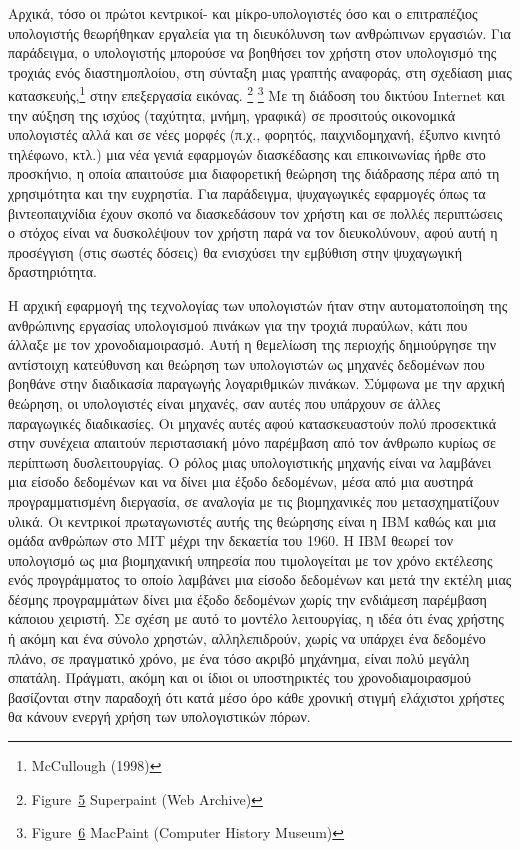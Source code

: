 \documentclass[
]{article}
\begin{document}
Αρχικά, τόσο οι πρώτοι κεντρικοί- και μίκρο-υπολογιστές όσο και ο
επιτραπέζιος υπολογιστής θεωρήθηκαν εργαλεία για τη διευκόλυνση των
ανθρώπινων εργασιών. Για παράδειγμα, ο υπολογιστής μπορούσε να βοηθήσει
τον χρήστη στον υπολογισμό της τροχιάς ενός διαστημοπλοίου, στη σύνταξη
μιας γραπτής αναφοράς, στη σχεδίαση μιας κατασκευής,\footnote{McCullough
  (1998)} στην επεξεργασία εικόνας. \footnote{Figure~\protect\hyperlink{fig:superpaint-toolbox}{5}
  Superpaint (Web Archive)} \footnote{Figure~\protect\hyperlink{fig:macpaint}{6}
  MacPaint (Computer History Museum)} Με τη διάδοση του δικτύου Internet
και την αύξηση της ισχύος (ταχύτητα, μνήμη, γραφικά) σε προσιτούς
οικονομικά υπολογιστές αλλά και σε νέες μορφές (π.χ., φορητός,
παιχνιδομηχανή, έξυπνο κινητό τηλέφωνο, κτλ.) μια νέα γενιά εφαρμογών
διασκέδασης και επικοινωνίας ήρθε στο προσκήνιο, η οποία απαιτούσε μια
διαφορετική θεώρηση της διάδρασης πέρα από τη χρησιμότητα και την
ευχρηστία. Για παράδειγμα, ψυχαγωγικές εφαρμογές όπως τα βιντεοπαιχνίδια
έχουν σκοπό να διασκεδάσουν τον χρήστη και σε πολλές περιπτώσεις ο
στόχος είναι να δυσκολέψουν τον χρήστη παρά να τον διευκολύνουν, αφού
αυτή η προσέγγιση (στις σωστές δόσεις) θα ενισχύσει την εμβύθιση στην
ψυχαγωγική δραστηριότητα.

Η αρχική εφαρμογή της τεχνολογίας των υπολογιστών ήταν στην
αυτοματοποίηση της ανθρώπινης εργασίας υπολογισμού πινάκων για την
τροχιά πυραύλων, κάτι που άλλαξε με τον χρονοδιαμοιρασμό. Αυτή η
θεμελίωση της περιοχής δημιούργησε την αντίστοιχη κατεύθυνση και θεώρηση
των υπολογιστών ως μηχανές δεδομένων που βοηθάνε στην διαδικασία
παραγωγής λογαριθμικών πινάκων. Σύμφωνα με την αρχική θεώρηση, οι
υπολογιστές είναι μηχανές, σαν αυτές που υπάρχουν σε άλλες παραγωγικές
διαδικασίες. Οι μηχανές αυτές αφού κατασκευαστούν πολύ προσεκτικά στην
συνέχεια απαιτούν περιστασιακή μόνο παρέμβαση από τον άνθρωπο κυρίως σε
περίπτωση δυσλειτουργίας. Ο ρόλος μιας υπολογιστικής μηχανής είναι να
λαμβάνει μια είσοδο δεδομένων και να δίνει μια έξοδο δεδομένων, μέσα από
μια αυστηρά προγραμματισμένη διεργασία, σε αναλογία με τις βιομηχανικές
που μετασχηματίζουν υλικά. Οι κεντρικοί πρωταγωνιστές αυτής της θεώρησης
είναι η IBM καθώς και μια ομάδα ανθρώπων στο MIT μέχρι την δεκαετία του
1960. Η IBM θεωρεί τον υπολογισμό ως μια βιομηχανική υπηρεσία που
τιμολογείται με τον χρόνο εκτέλεσης ενός προγράμματος το οποίο λαμβάνει
μια είσοδο δεδομένων και μετά την εκτέλη μιας δέσμης προγραμμάτων δίνει
μια έξοδο δεδομένων χωρίς την ενδιάμεση παρέμβαση κάποιου χειριστή. Σε
σχέση με αυτό το μοντέλο λειτουργίας, η ιδέα ότι ένας χρήστης ή ακόμη
και ένα σύνολο χρηστών, αλληλεπιδρούν, χωρίς να υπάρχει ένα δεδομένο
πλάνο, σε πραγματικό χρόνο, με ένα τόσο ακριβό μηχάνημα, είναι πολύ
μεγάλη σπατάλη. Πράγματι, ακόμη και οι ίδιοι οι υποστηρικτές του
χρονοδιαμοιρασμού βασίζονται στην παραδοχή ότι κατά μέσο όρο κάθε
χρονική στιγμή ελάχιστοι χρήστες θα κάνουν ενεργή χρήση των
υπολογιστικών πόρων.
\end{document}
